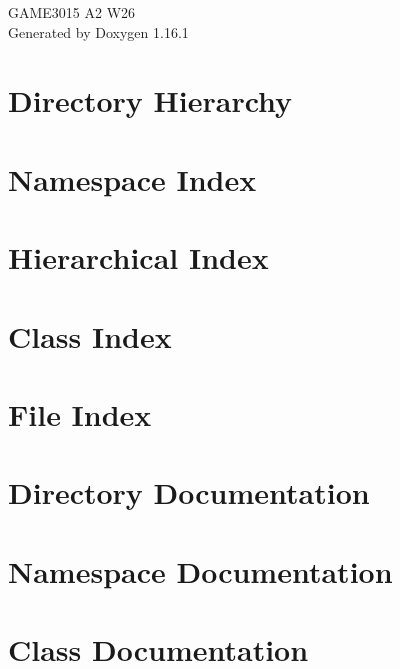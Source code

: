 \documentclass[twoside]{book}
\newcommand{\+}{\discretionary{\mbox{\scriptsize$\hookleftarrow$}}{}{}}
\newcommand{\clearemptydoublepage}{%
    \newpage{\pagestyle{empty}\cleardoublepage}%
  }
\begin{document}
  \raggedbottom
    \hypersetup{pageanchor=false,
                bookmarksnumbered=true,
                pdfencoding=unicode
               }
  \begin{titlepage}
  \vspace*{7cm}
  \begin{center}%
  {\Large GAME3015 A2 W26}\\
  \vspace*{1cm}
  {\large Generated by Doxygen 1.16.1}\\
  \end{center}
  \end{titlepage}
  \clearemptydoublepage
  \tableofcontents
  \clearemptydoublepage
  \hypersetup{pageanchor=true}
\chapter{Directory Hierarchy}

\chapter{Namespace Index}

\chapter{Hierarchical Index}

\chapter{Class Index}

\chapter{File Index}

\chapter{Directory Documentation}


\chapter{Namespace Documentation}

\chapter{Class Documentation}
















\end{document}

